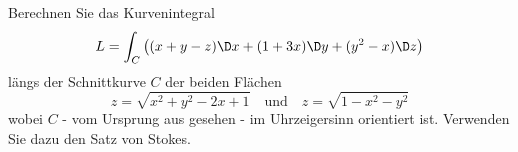 \begin{atiTask}[
  title = Satz von Stokes
]
Berechnen Sie das Kurvenintegral
\[
L=\int_C\left((x+y-z)\D x+(1+3x)\D y+(y^2-x)\D z\right)
\]
längs der Schnittkurve $C$ der beiden Flächen
\[z=\sqrt{x^2+y^2-2x+1}\quad \text{und}\quad z=\sqrt{1-x^2-y^2}
\]
wobei $C$ - vom Ursprung aus gesehen - im Uhrzeigersinn orientiert ist. Verwenden Sie dazu den Satz von Stokes.
\end{atiTask}